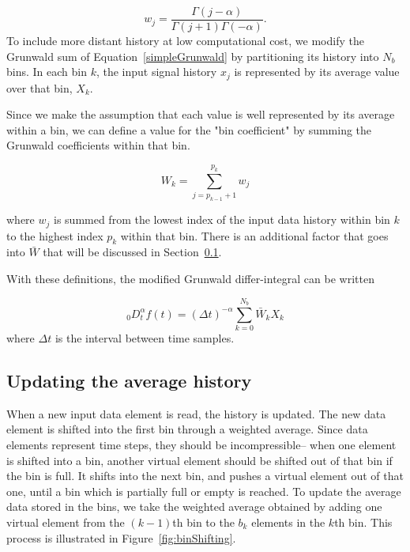 \begin{equation}
w_{j} = \frac{\Gamma(j-\alpha)}{\Gamma(j+1)\Gamma(-\alpha)}.
\label{wj}
\end{equation}
To include more distant history at low computational cost, we modify
the Grunwald sum of Equation~\ref{simpleGrunwald} by partitioning its
history into $N_b$ bins. In each bin $k$, the input signal history
$x_j$ is represented by its average value over that bin, $X_k$.

Since we make the assumption that each value is well represented by
its average within a bin, we can define a value for the "bin
coefficient" by summing the Grunwald coefficients within that bin.

\begin{equation}
W_k = \displaystyle\sum\limits_{j=p_{k-1}+1}^{p_k} w_j
\label{eqn:sumWk}
\end{equation}

\noindent where $w_j$ is summed from the lowest index of the input data history within bin $k$ to the highest index $p_k$ within that bin. There is an additional factor that goes into $\bar{W}$ that will be discussed in Section~\ref{sec:shifting}. 

With these definitions, the modified Grunwald differ-integral can be written

\begin{equation}
_0D^\alpha_t f(t) = \displaystyle(\Delta t)^{-\alpha}\sum\limits_{k=0}^{N_b}\bar{W}_kX_k
\label{avgSimpleGrunwald}
\end{equation}
where $\Delta t$ is the interval between time samples.



\subsection{Updating the average history}
\label{sec:shifting}

When a new input data element is read, the history is updated. The new data element is shifted into the first bin through a weighted average. Since data elements represent time steps, they should be incompressible-- when one element is shifted into a bin, another virtual element should be shifted out of that bin if the bin is full. It shifts into the next bin, and pushes a virtual element out of that one, until a bin which is partially full or empty is reached. To update the average data stored in the bins, we take the weighted average obtained by adding one virtual element from the $(k-1)$th bin to the $b_k$ elements in the $k$th bin. This process is illustrated in Figure~\ref{fig:binShifting}.

